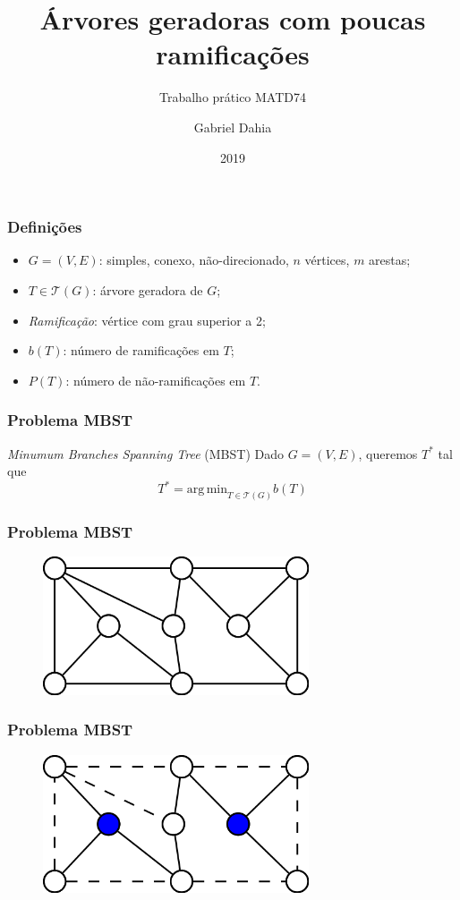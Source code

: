 \documentclass[14pt]{beamer}
\title{\'Arvores geradoras com poucas ramifica\c{c}\~oes}
\subtitle{Trabalho pr\'atico MATD74}
\author{Gabriel Dahia}
\institute{Universidade Federal da Bahia}
\date{2019}
\begin{document}
\frame{\titlepage}

\begin{frame}
\frametitle{Defini\c{c}\~oes}
\begin{itemize}
\item<1-> $G = (V, E)$: simples, conexo, n\~ao-direcionado, $n$ v\'ertices, $m$ arestas;
\item<2-> $T \in \mathcal{T}(G)$: \'arvore geradora de $G$;
\item<3-> \emph{Ramifica\c{c}\~ao}: v\'ertice com grau superior a 2;
\item<4-> $b(T)$: n\'umero de ramifica\c{c}\~oes em $T$;
\item<4-> $P(T)$: n\'umero de n\~ao-ramifica\c{c}\~oes em $T$.
\end{itemize}
\end{frame}

\begin{frame}
\frametitle{Problema MBST}
\begin{block}{\textit{Minumum Branches Spanning Tree} (MBST)}
Dado $G = (V, E)$, queremos $T^*$ tal que
\begin{equation}
T^* = \mathrm{arg\,min}_{T \in \mathcal{T}(G)} b(T)
\end{equation}
\end{block}
\end{frame}

\begin{frame}
\frametitle{Problema MBST}
\begin{figure}
\includegraphics[width=0.7\textwidth]{figures/minbst1.png}
\end{figure}
\end{frame}

\begin{frame}
\frametitle{Problema MBST}
\begin{figure}
\includegraphics[width=0.7\textwidth]{figures/minbst2.png}
\end{figure}
\end{frame}
\end{document}
